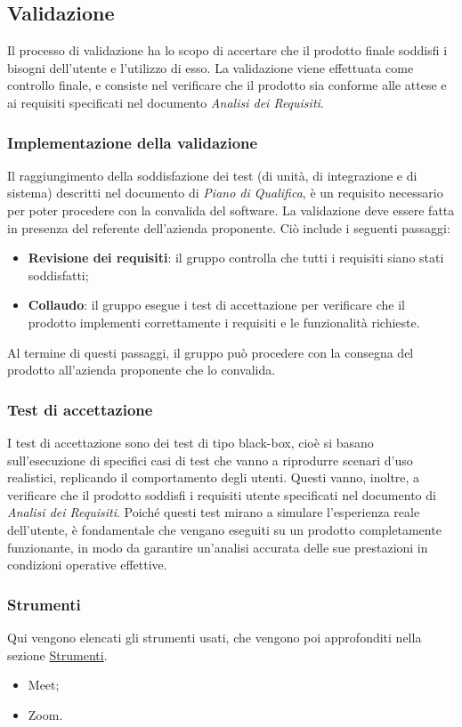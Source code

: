 \subsection{Validazione}
\label{subsec:proc_validazione}

Il processo di validazione ha lo scopo di accertare che il prodotto finale soddisfi i bisogni dell'utente e l'utilizzo di esso.
La validazione viene effettuata come controllo finale, e consiste nel verificare che il prodotto sia conforme alle attese e ai requisiti specificati nel documento \textit{Analisi dei Requisiti}.

\subsubsection{Implementazione della validazione}

Il raggiungimento della soddisfazione dei test (di unità, di integrazione e di sistema) descritti nel documento di \textit{Piano di Qualifica}, è un requisito necessario per poter procedere con la convalida del software.
La validazione deve essere fatta in presenza del referente dell'azienda proponente. Ciò include i seguenti passaggi:
\begin{itemize}
    \item \textbf{Revisione dei requisiti}: il gruppo controlla che tutti i requisiti siano stati soddisfatti;
    \item \textbf{Collaudo}: il gruppo esegue i test di accettazione per verificare che il prodotto implementi correttamente i requisiti e le funzionalità richieste.
\end{itemize}
Al termine di questi passaggi, il gruppo può procedere con la consegna del prodotto all'azienda proponente che lo convalida.

\subsubsection{Test di accettazione}
I test di accettazione sono dei test di tipo black-box, cioè si basano sull'esecuzione di specifici casi di test che vanno a riprodurre scenari d'uso realistici, replicando il comportamento degli utenti.
Questi vanno, inoltre, a verificare che il prodotto soddisfi i requisiti utente specificati nel documento di \textit{Analisi dei Requisiti}.
Poiché questi test mirano a simulare l'esperienza reale dell'utente, è fondamentale che vengano eseguiti su un prodotto completamente funzionante, in modo da garantire un'analisi accurata delle sue prestazioni in condizioni operative effettive.

\subsubsection{Strumenti}
Qui vengono elencati gli strumenti usati, che vengono poi approfonditi nella sezione \hyperref[sec:strumenti]{Strumenti}.
\begin{itemize}
    \item Meet;
    \item Zoom.
\end{itemize}
